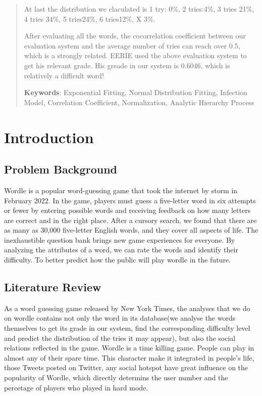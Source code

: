 \documentclass[12pt]{article}  %
\begin{document}
\begin{abstract}
At last the distribution we claculated is 1 try: 0\%, 2 tries:4\%, 3 tries 21\%, 4 tries 34\%, 5 tries24\%, 6 tries12\%, X 3\%.


After evaluating all the words, the cocorrelation coefficient between our evaluation system and the average number of tries can reach over 0.5, which is a strongly related. EERIE used the above evaluation system to get his relevant grade. His greade in our system is 0.6046, which is relatively a difficult word!




     \vspace{5pt}
     \textbf{Keywords}: Exponential Fitting, Normal Distribution Fitting, Infection Model, Correlation Coefficient, Normalization, Analytic Hierarchy Process 

\end{abstract}

\maketitle  %
\tableofcontents  %


\section{Introduction}
\subsection{Problem Background}
Wordle is a popular word-guessing game that took the internet by storm in February 2022. In the game, players must guess a five-letter word in six attempts or fewer by entering possible words and receiving feedback on how many letters are correct and in the right place. After a cursory search, we found that there are as many as 30,000 five-letter English words, and they cover all aspects of life. The inexhaustible question bank brings new game experiences for everyone. By analyzing the attributes of a word, we can rate the words and identify their difficulty. To better predict how the public will play wordle in the future.




\subsection{Literature Review}
  As a word guessing game released by New York Times, the analyses that we do on wordle contains not only the word in its database(we analyse the words themselves to get its grade in our system, find the corresponding difficulty level and predict the distribution of the tries it may appear), but also the social relations reflected in the game. Wordle is a time killing game. People can play in almost any of their spare time. This character make it integrated in people's life, those Tweets posted on Twitter, any social hotspot have great influence on the popularity of Wordle, which directly determins the user number and the percetage of players who played in hard mode. 
\end{document}
